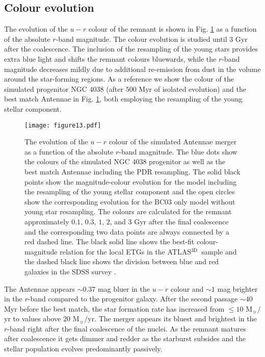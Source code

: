 \documentclass[a4paper,fleqn,usenatbib]{mnras}
\newcommand{\atlas}{\textsc{ATLAS$^\mathrm{3D}$}}
\begin{document}
\subsection{Colour evolution}\label{section:colour_evolution}

The evolution of the $u-r$ colour of the remnant is shown in Fig. 
\ref{fig:colours} as a function of the absolute $r$-band magnitude. The colour
evolution is studied until $3$ Gyr after the coalescence.
The inclusion of the resampling of the young stars provides extra blue light and shifts the remnant
colours bluewards, while the $r$-band magnitude decreases mildly due to
additional re-emission from dust in the volume around the star-forming regions.
As a reference we show the colour of the simulated progenitor NGC 4038 (after $500$ Myr of isolated evolution) 
and the best match Antennae in Fig. \ref{fig:colours}, both employing the resampling of the young stellar component.

\begin{figure}
    \texttt{[image: figure13.pdf]}
    \caption{The evolution of the $u-r$ colour of the simulated Antennae merger as a function 
of the absolute $r$-band magnitude. 
The blue dots show the colours of the simulated NGC 4038 progenitor as well
as the best match Antennae including the PDR resampling. The solid black points show the magnitude-colour
evolution for the model including the resampling of the young stellar component and the open circles 
show the corresponding evolution for the BC03 only model without young star resampling. 
The colours are calculated for the remnant approximately $0.1$, $0.3$, $1$, $2$, and $3$ Gyr 
after the final coalescence and the corresponding two data points are always connected by a red dashed line.
The black solid line shows the best-fit colour-magnitude relation for the local ETGs in 
the \atlas\ sample \citep{2011MNRAS.413..813C}
and the dashed black line shows the division between blue and red galaxies in the SDSS survey \citep{2004ApJ...600..681B}.}
    \label{fig:colours}
\end{figure}


The Antennae appears $\sim0.37$ mag bluer in the $u-r$ colour and $\sim1$ mag brighter in the $r$-band compared to the
progenitor galaxy. After the second passage $\sim 40$ Myr before the best match, the 
star formation rate has increased from $\le 10$ M$_{\sun}/$yr 
to values above $20$ M$_{\sun}/$yr.
The merger appears its bluest and brightest in the $r$-band
right after the final coalescence of the nuclei. 
As the remnant matures after coalescence it gets dimmer and redder as the starburst 
subsides and the stellar population evolves predominantly passively. 
\end{document}
